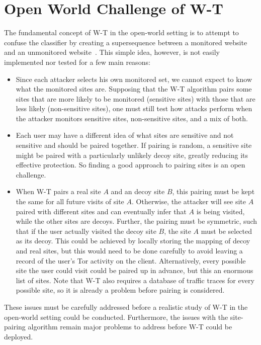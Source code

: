 \documentclass[USenglish,oneside,twocolumn]{article}
\begin{document}
\section{Open World Challenge of W-T}\label{discussion:OW-W-T}
The fundamental concept of W-T in the open-world setting is to attempt to confuse the classifier by creating a supersequence between a monitored website and an unmonitored website~\cite{wang2017walkie}. This simple idea, however, is not easily implemented nor tested for a few main reasons:
\begin{itemize}
    \item Since each attacker selects his own monitored set, we cannot expect to know what the monitored sites are. Supposing that the W-T algorithm pairs some sites that are more likely to be monitored (sensitive sites) with those that are less likely (non-sensitive sites), one must still test how attacks perform when the attacker monitors sensitive sites, non-sensitive sites, and a mix of both.
    
    \item Each user may have a different idea of what sites are sensitive and not sensitive and should be paired together. If pairing is random, a sensitive site might be paired with a particularly unlikely decoy site, greatly reducing its effective protection. So finding a good approach to pairing sites is an open challenge. 

    \item When W-T pairs a real site $A$ and an decoy site $B$, this pairing must be kept the same for all future visits of site $A$. Otherwise, the attacker will see site $A$ paired with different sites and can eventually infer that $A$ is being visited, while the other sites are decoys. Further, the pairing must be symmetric, such that if the user actually visited the decoy site $B$, the site $A$ must be selected as its decoy. This could be achieved by locally storing the mapping of decoy and real sites, but this would need to be done carefully to avoid leaving a record of the user's Tor activity on the client. Alternatively, every possible site the user could visit could be paired up in advance, but this an enormous list of sites. Note that W-T also requires a database of traffic traces for every possible site, so it is already a problem before pairing is considered.
    






\end{itemize}
These issues must be carefully addressed before a realistic study of W-T in the open-world setting could be conducted. Furthermore, the issues with the site-pairing algorithm remain major problems to address before W-T could be deployed.
 
\end{document}

